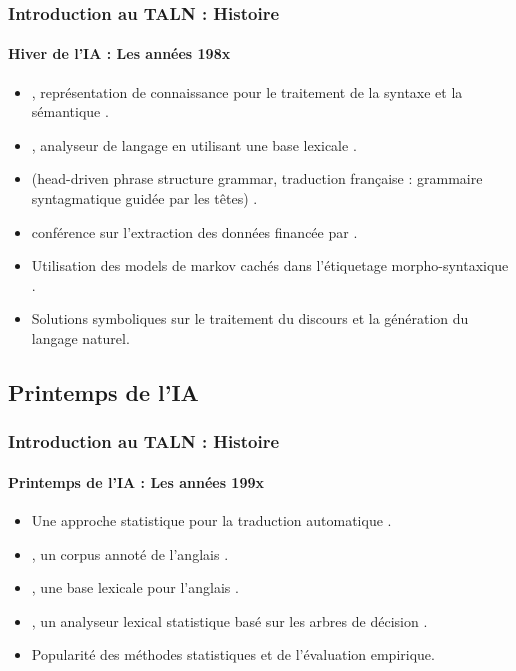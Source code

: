 \documentclass[xcolor=table]{beamer}
\begin{document}
\begin{frame}
\frametitle{Introduction au TALN : Histoire}
\framesubtitle{Hiver de l'IA : Les années 198x}

\begin{itemize}
	\item {} , représentation de connaissance pour le traitement de la syntaxe et la sémantique \cite{1980-bobrow}.
	\item {} , analyseur de langage en utilisant une base lexicale \cite{1986-jacobs}.
	\item {}  (head-driven phrase structure grammar, traduction française : grammaire syntagmatique guidée par les têtes) \cite{1987-sag-pollard}.
	\item {}  conférence sur l'extraction des données financée par .
	\item {} Utilisation des models de markov cachés dans  l'étiquetage morpho-syntaxique \cite{1988-church}.
	\item Solutions symboliques sur le traitement du discours et la génération du langage naturel.
\end{itemize}

\end{frame}

\subsection{Printemps de l'IA}

\begin{frame}
\frametitle{Introduction au TALN : Histoire}
\framesubtitle{Printemps de l'IA : Les années 199x}

\begin{itemize}
	\item {} Une approche statistique pour la traduction automatique \cite{1990-brown-al}.
	\item {} , un corpus annoté de l'anglais \cite{1993-marcus-al}.
	\item {} , une base lexicale pour l'anglais \cite{1995-miller}.
	\item {} , un analyseur lexical statistique basé sur les arbres de décision \cite{1996-magerman}.
	\item Popularité des méthodes statistiques et de l'évaluation empirique.
\end{itemize}

\end{frame}
\end{document}
